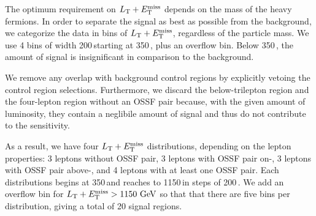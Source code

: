 The optimum requirement on $L_\textrm{T} + E_{\mathrm{T}}^{\text{miss}}$ depends on the mass of the heavy fermions. In order to separate the signal as best as possible from the background, we categorize the data in bins of $L_\textrm{T} + E_{\mathrm{T}}^{\text{miss}}$, regardless of the particle mass. We use 4 bins of width 200\,\GeV starting at 350\,\GeV, plus an overflow bin. Below 350\,\GeV, the amount of signal is insignificant in comparison to the background.

We remove any overlap with background control regions by explicitly vetoing the control region selections. Furthermore, we discard the below-\Z trilepton region and the four-lepton region without an OSSF pair because, with the given amount of luminosity, they contain a neglibile amount of signal and thus do not contribute to the sensitivity.

As a result, we have four $L_\textrm{T} + E_{\mathrm{T}}^{\text{miss}}$ distributions, depending on the lepton properties: 3 leptons without OSSF pair, 3 leptons with OSSF pair on-\Z, 3 leptons with OSSF pair above-\Z, and 4 leptons with at least one OSSF pair. Each distributions begins at 350\,\GeV and reaches to 1150\,\GeV in steps of 200\,\GeV. We add an overflow bin for $L_\textrm{T} + E_{\mathrm{T}}^{\text{miss}} > 1150\,\,\text{Ge\hspace{-.08em}V}$ so that that there are five bins per distribution, giving a total of 20 signal regions.


